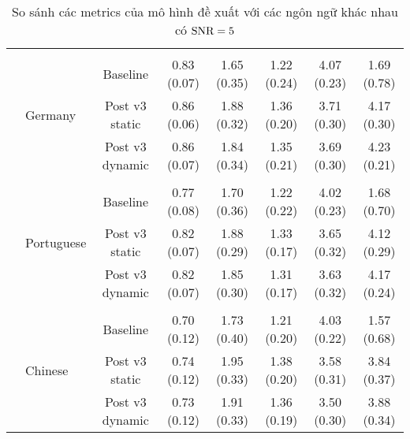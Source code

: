 \begin{sidewaystable}
\begin{subtable}{\textwidth}
\begin{tabular}{llcccccc}
					&&&&&&&\\
					& \multirow{3}{*}{Germany}      &Baseline       & 0.83 (0.07)   & 1.65 (0.35)   & 1.22 (0.24)   & 4.07 (0.23)   & 1.69 (0.78) \\
					&               &Post v3 static & 0.86 (0.06)   & 1.88 (0.32)   & 1.36 (0.20)   & 3.71 (0.30)   & 4.17 (0.30) \\
					&               &Post v3 dynamic        & 0.86 (0.07)   & 1.84 (0.34)   & 1.35 (0.21)   & 3.69 (0.30)   & 4.23 (0.21) \\
					&&&&&&&\\
					& \multirow{3}{*}{Portuguese}   &Baseline       & 0.77 (0.08)   & 1.70 (0.36)   & 1.22 (0.22)   & 4.02 (0.23)   & 1.68 (0.70) \\
					&               &Post v3 static & 0.82 (0.07)   & 1.88 (0.29)   & 1.33 (0.17)   & 3.65 (0.32)   & 4.12 (0.29) \\
					&               &Post v3 dynamic        & 0.82 (0.07)   & 1.85 (0.30)   & 1.31 (0.17)   & 3.63 (0.32)   & 4.17 (0.24) \\
					&&&&&&&\\
					& \multirow{3}{*}{Chinese}      &Baseline       & 0.70 (0.12)   & 1.73 (0.40)   & 1.21 (0.20)   & 4.03 (0.22)   & 1.57 (0.68) \\
					&               &Post v3 static & 0.74 (0.12)   & 1.95 (0.33)   & 1.38 (0.20)   & 3.58 (0.31)   & 3.84 (0.37) \\
					&               &Post v3 dynamic        & 0.73 (0.12)   & 1.91 (0.33)   & 1.36 (0.19)   & 3.50 (0.30)   & 3.88 (0.34) \\
					\hline
				\end{tabular}
				\caption{So sánh các metrics của mô hình đề xuất với các ngôn ngữ khác nhau có $\text{SNR}=5$}
			\end{subtable}
		\end{sidewaystable}
	
		\clearpage
		
